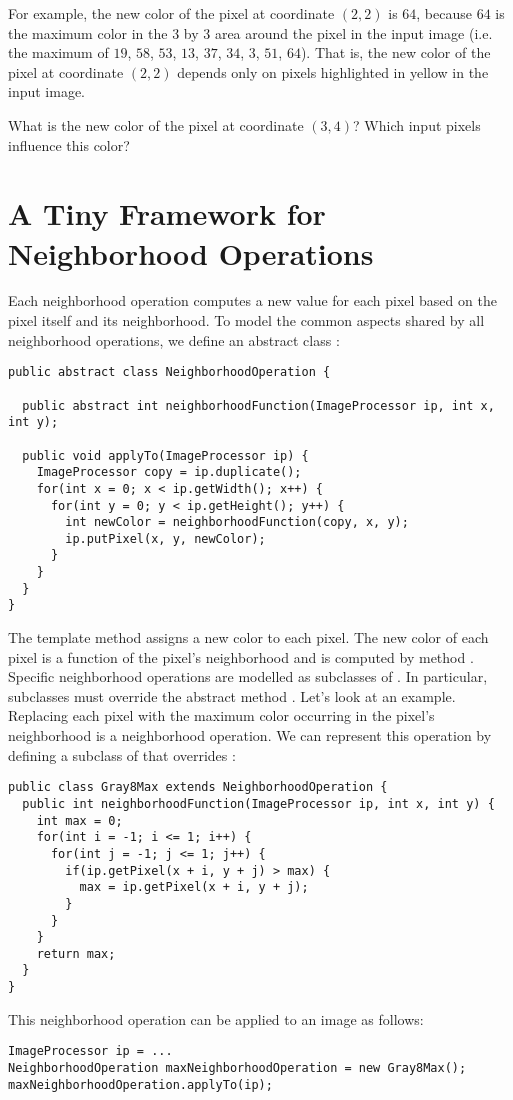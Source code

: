 \documentclass{book}
\begin{document}
For example, the new color of the pixel at coordinate $(2, 2)$ is $64$, because $64$ is the maximum color in the 3 by 3 area around the pixel in the input image (i.e. the maximum of $19$, $58$, $53$, $13$, $37$, $34$, $3$, $51$, $64$). That is, the new color of the pixel at coordinate $(2, 2)$ depends only on pixels highlighted in yellow in the input image.

\begin{exercise}
What is the new color of the pixel at coordinate $(3, 4)$? Which input pixels influence this color?
\end{exercise}

\section{A Tiny Framework for Neighborhood Operations}
Each neighborhood operation computes a new value for each pixel based on the pixel itself and its neighborhood. To model the common aspects shared by all neighborhood operations, we define an abstract class :
\begin{lstlisting}
public abstract class NeighborhoodOperation {

  public abstract int neighborhoodFunction(ImageProcessor ip, int x, int y);

  public void applyTo(ImageProcessor ip) {
    ImageProcessor copy = ip.duplicate();
    for(int x = 0; x < ip.getWidth(); x++) {
      for(int y = 0; y < ip.getHeight(); y++) {
        int newColor = neighborhoodFunction(copy, x, y);
        ip.putPixel(x, y, newColor);     
      }    
    }  
  }
}
\end{lstlisting}
The template method  assigns a new color to each pixel. The new color of each pixel is a function of the pixel's neighborhood and is computed by method .  Specific neighborhood operations are modelled as subclasses of . In particular, subclasses must override the abstract method . Let's look at an example. Replacing each pixel with the maximum color occurring in the pixel's neighborhood is a neighborhood operation. We can represent this operation by defining a subclass of  that overrides :
\begin{lstlisting}
public class Gray8Max extends NeighborhoodOperation {
  public int neighborhoodFunction(ImageProcessor ip, int x, int y) {
    int max = 0;
    for(int i = -1; i <= 1; i++) {
      for(int j = -1; j <= 1; j++) {
        if(ip.getPixel(x + i, y + j) > max) {
          max = ip.getPixel(x + i, y + j);          
        }
      }      
    }
    return max;
  }
}
\end{lstlisting}
This neighborhood operation can be applied to an image as follows:
\begin{lstlisting}
ImageProcessor ip = ...
NeighborhoodOperation maxNeighborhoodOperation = new Gray8Max();
maxNeighborhoodOperation.applyTo(ip);
\end{lstlisting}
\end{document}
